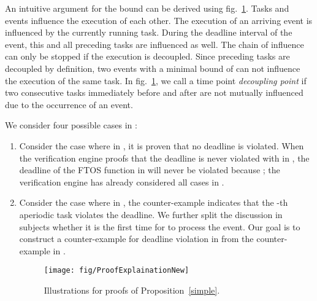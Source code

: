\documentclass[10pt, a4paper, onecolumn, conference, compsocconf]{IEEEtran}
\begin{document}
An intuitive argument for the bound  can be derived using fig.~\ref{fig:Proof.Explanation}. Tasks and events influence the execution of each other. The execution of an arriving event is influenced by the currently running task. During the deadline interval of the event, this and all preceding tasks are influenced as well. The chain of influence can only be stopped if the execution is decoupled. Since preceding tasks are decoupled by definition, two events with a minimal bound of  can not influence the execution of the same task. In fig.~\ref{fig:Proof.Explanation}, we call a time point  \emph{decoupling point} if two consecutive tasks immediately before and after  are not mutually influenced due to the occurrence of an event.



\begin{IEEEproof}
We consider four possible cases in :
\begin{enumerate}
    \item Consider the case where in , it is proven that no deadline is violated. When the verification engine proofs that the deadline is never
            violated with  in , the deadline of the FTOS function in  will never be violated because ; the verification engine has already considered  all cases in .
    \item Consider the case where in , the counter-example indicates that the -th aperiodic task violates the deadline. We further split the discussion in subjects whether it is the first time for  to process the event. Our goal is to construct a counter-example for deadline violation in  from the counter-example in .
\begin{figure}
 \centering
 \texttt{[image: fig/ProofExplainationNew]}
 \caption{Illustrations for proofs of Proposition~\ref{simple}.}
 \label{fig:Proof.Explanation}


\end{figure}
\end{enumerate}
\end{IEEEproof}
\end{document}
